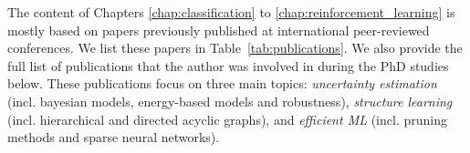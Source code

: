 The content of Chapters \ref{chap:classification} to \ref{chap:reinforcement_learning} is mostly based on papers previously published at international peer-reviewed conferences. We list these papers in Table~\ref{tab:publications}.
We also provide the full list of publications that the author was involved in during the PhD studies below. These publications focus on three main topics: \emph{uncertainty estimation} (incl. bayesian models, energy-based models and robustness), \emph{structure learning} (incl. hierarchical and directed acyclic graphs), and \emph{efficient ML} (incl. pruning methods and sparse neural networks).

\renewcommand{\bibsection}{}
